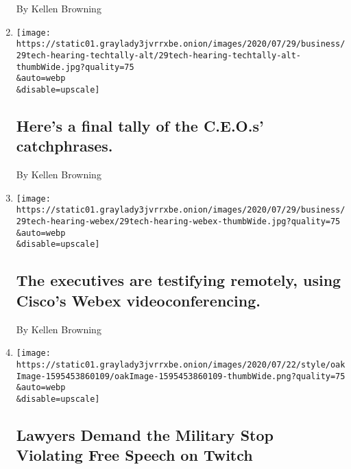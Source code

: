 \begin{enumerate}
  By Kellen Browning
\item
  \href{/live/2020/07/29/technology/tech-ceos-hearing-testimony/what-ceos-said}{}

  \texttt{[image: https://static01.graylady3jvrrxbe.onion/images/2020/07/29/business/29tech-hearing-techtally-alt/29tech-hearing-techtally-alt-thumbWide.jpg?quality=75\\\&auto=webp\\\&disable=upscale]}

  \hypertarget{heres-a-final-tally-of-the-ceos-catchphrases}{%
  \subsection{Here's a final tally of the C.E.O.s'
  catchphrases.}\label{heres-a-final-tally-of-the-ceos-catchphrases}}

  By Kellen Browning
\item
  \href{/live/2020/07/29/technology/tech-ceos-hearing-testimony/the-executives-are-testifying-remotely-using-ciscos-webex-videoconferencing}{}

  \texttt{[image: https://static01.graylady3jvrrxbe.onion/images/2020/07/29/business/29tech-hearing-webex/29tech-hearing-webex-thumbWide.jpg?quality=75\\\&auto=webp\\\&disable=upscale]}

  \hypertarget{the-executives-are-testifying-remotely-using-ciscos-webex-videoconferencing}{%
  \subsection{The executives are testifying remotely, using Cisco's
  Webex
  videoconferencing.}\label{the-executives-are-testifying-remotely-using-ciscos-webex-videoconferencing}}

  By Kellen Browning
\item
  \href{/2020/07/22/style/army-gamers-war-crimes-first-amendment.html}{}

  \texttt{[image: https://static01.graylady3jvrrxbe.onion/images/2020/07/22/style/oakImage-1595453860109/oakImage-1595453860109-thumbWide.png?quality=75\\\&auto=webp\\\&disable=upscale]}

  \hypertarget{lawyers-demand-the-military-stop-violating-free-speech-on-twitch}{%
  \subsection{Lawyers Demand the Military Stop Violating Free Speech on
  Twitch}\label{lawyers-demand-the-military-stop-violating-free-speech-on-twitch}}


\end{enumerate}
